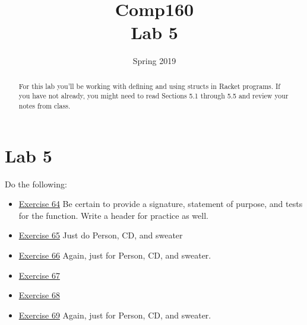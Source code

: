 \documentclass[nobib]{tufte-handout}
\title{Comp160 \\ Lab 5 }
\author{}
\date{ Spring 2019 }
\begin{document}
\maketitle

\begin{abstract}
For this lab you'll be working with defining and using structs in Racket programs.  If you have not already, you might need to read Sections 5.1 through 5.5 and review your notes from class.
\end{abstract}

\section*{Lab 5}

Do the following:
\begin{itemize}
  \item \href{https://htdp.org/2018-01-06/Book/part_one.html#%28counter._%28exercise._struct2%29%29}{Exercise 64} Be certain to provide a signature, statement of purpose, and tests for the function.  Write a header for practice as well.
  \item \href{https://htdp.org/2018-01-06/Book/part_one.html#%28counter._%28exercise._struct3%29%29}{Exercise 65} Just do Person, CD, and sweater
  \item \href{https://htdp.org/2018-01-06/Book/part_one.html#%28counter._%28exercise._struct3b%29%29}{Exercise 66} Again, just for Person, CD, and sweater.
  \item \href{https://htdp.org/2018-01-06/Book/part_one.html#%28counter._%28exercise._struct4%29%29}{Exercise 67}
  \item \href{https://htdp.org/2018-01-06/Book/part_one.html#%28counter._%28exercise._struct5%29%29}{Exercise 68}
  \item \href{https://htdp.org/2018-01-06/Book/part_one.html#%28counter._%28exercise._struct3a%29%29}{Exercise 69} Again, just for Person, CD, and sweater.
\end{itemize}
\end{document}
